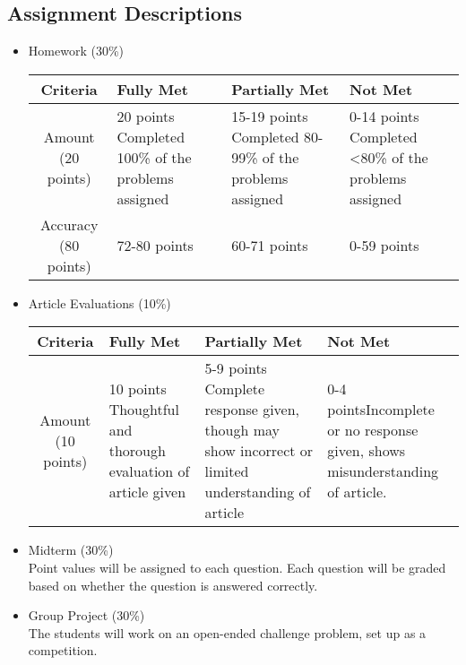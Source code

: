 \documentclass[11pt]{article}
\begin{document}
\subsection*{Assignment Descriptions}
\begin{itemize}
\item Homework (30\%)\\
\begin{center}
\begin{tabular}{c|m{10em}|m{10em}|m{10em}}
Criteria & Fully Met & Partially Met & Not Met \\
\hline
Amount (20 points) & 20 points \newline Completed 100\% of the problems assigned & 15-19 points \newline Completed 80-99\% of the problems assigned & 0-14 points \newline Completed <80\% of the problems assigned\\
\hline
Accuracy (80 points) & 72-80 points & 60-71 points & 0-59 points\\
\end{tabular}
\end{center}
\item Article Evaluations (10\%)
\begin{center}
\begin{tabular}{c|m{10em}|m{10em}|m{10em}}
Criteria & Fully Met & Partially Met & Not Met \\
\hline
Amount (10 points) & 10 points \newline Thoughtful and thorough evaluation of article given & 5-9 points \newline Complete response given, though may show incorrect or limited understanding of article & 0-4 points\newline Incomplete or no response given, shows misunderstanding of article.\\
\end{tabular}
\end{center}
\item Midterm (30\%)\\
Point values will be assigned to each question. Each question will be graded based on whether the question is answered correctly.
\item Group Project (30\%)\\
The students will work on an open-ended challenge problem, set up as a competition.
\begin{center}
\begin{tabular}{m{9em}|m{10em}|m{10em}|m{10em}}

\end{tabular}
\end{center}
\end{itemize}
\end{document}
